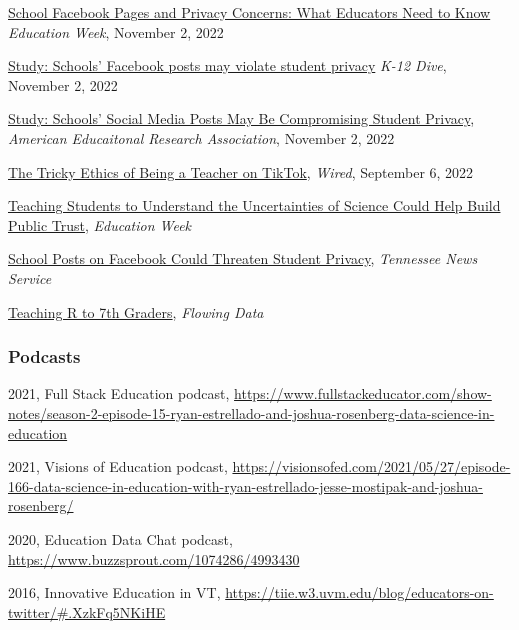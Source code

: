 \documentclass[
  14,
]{article}
\begin{document}
\href{https://www.edweek.org/technology/school-facebook-pages-and-privacy-concerns-what-educators-need-to-know/2022/11}{School
Facebook Pages and Privacy Concerns: What Educators Need to Know}
\emph{Education Week}, November 2, 2022

\href{https://www.k12dive.com/news/facebook-posts-may-violate-student-privacy/635525/\#:~:text=Dive\%20Brief\%3A,the\%20American\%20Educational\%20Research\%20Association.}{Study:
Schools' Facebook posts may violate student privacy} \emph{K-12 Dive},
November 2, 2022

\href{https://www.aera.net/Newsroom/Study-Schools-Social-Media-Posts-May-Be-Compromising-Student-Privacy}{Study:
Schools' Social Media Posts May Be Compromising Student Privacy},
\emph{American Educaitonal Research Association}, November 2, 2022

\href{https://www.wired.com/story/teachers-on-tiktok/}{The Tricky Ethics
of Being a Teacher on TikTok}, \emph{Wired}, September 6, 2022

\href{https://www.edweek.org/teaching-learning/teaching-students-to-understand-the-uncertainties-of-science-could-help-build-public-trust/2022/07}{Teaching
Students to Understand the Uncertainties of Science Could Help Build
Public Trust}, \emph{Education Week}

\href{https://www.publicnewsservice.org/cuts/75/rss-75345-1.mp3}{School
Posts on Facebook Could Threaten Student Privacy}, \emph{Tennessee News
Service}

\href{https://flowingdata.com/2019/11/26/teaching-r-to-7th-graders/}{Teaching
R to 7th Graders}, \emph{Flowing Data}

\hypertarget{podcasts}{%
\subsubsection{Podcasts}\label{podcasts}}

2021, Full Stack Education podcast,
\url{https://www.fullstackeducator.com/show-notes/season-2-episode-15-ryan-estrellado-and-joshua-rosenberg-data-science-in-education}

2021, Visions of Education podcast,
\url{https://visionsofed.com/2021/05/27/episode-166-data-science-in-education-with-ryan-estrellado-jesse-mostipak-and-joshua-rosenberg/}

2020, Education Data Chat podcast,
\url{https://www.buzzsprout.com/1074286/4993430}

2016, Innovative Education in VT,
\url{https://tiie.w3.uvm.edu/blog/educators-on-twitter/\#.XzkFq5NKiHE}
\end{document}
